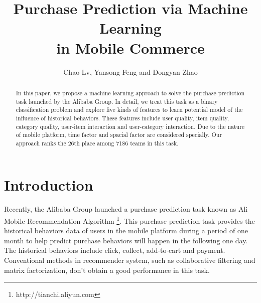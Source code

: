 \documentclass{llncs}
\begin{document}
%
\title{Purchase Prediction via Machine Learning\\
in Mobile Commerce}
%
\author{
	Chao Lv, Yansong Feng\inst{*} and Dongyan Zhao
}
%
%
\maketitle
%
\begin{abstract}
In this paper, we propose a machine learning approach
to solve the purchase prediction task launched by the Alibaba Group.
In detail, we treat this task as a binary classification problem
and explore five kinds of features to learn potential model
of the influence of historical behaviors.
These features include user quality, item quality, category quality,
user-item interaction and user-category interaction.
Due to the nature of mobile platform,
time factor and spacial factor are considered specially.
Our approach ranks the 26th place among 7186 teams in this task.
\end{abstract}
%
\section{Introduction}
%
Recently, the Alibaba Group launched a purchase prediction task known as
Ali Mobile Recommendation Algorithm \footnote{http://tianchi.aliyun.com}.
This purchase prediction task provides the historical behaviors data of users
in the mobile platform during a period of one month
to help predict purchase behaviors will happen in the following one day.
The historical behaviors include click, collect, add-to-cart and payment.
Conventional methods in recommender system\cite{lu2012recommender},
such as collaborative filtering and matrix factorization,
don't obtain a good performance in this task.
\end{document}
